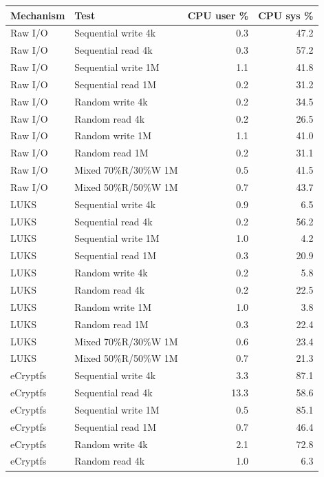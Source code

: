 \documentclass[a4paper]{article}
\begin{document}
\begin{table}[H]
    \centering
    \small
    \begin{tabular}{|l|l|r|r|}
        \hline
        Mechanism & Test & CPU user \% & CPU sys \% \\
        \hline
        Raw I/O & Sequential write 4k & 0.3 & 47.2 \\
        Raw I/O & Sequential read 4k & 0.3 & 57.2 \\
        Raw I/O & Sequential write 1M & 1.1 & 41.8 \\
        Raw I/O & Sequential read 1M & 0.2 & 31.2 \\
        Raw I/O & Random write 4k & 0.2 & 34.5 \\
        Raw I/O & Random read 4k & 0.2 & 26.5 \\
        Raw I/O & Random write 1M & 1.1 & 41.0 \\
        Raw I/O & Random read 1M & 0.2 & 31.1 \\
        Raw I/O & Mixed 70\%R/30\%W 1M & 0.5 & 41.5 \\
        Raw I/O & Mixed 50\%R/50\%W 1M & 0.7 & 43.7 \\
        LUKS & Sequential write 4k & 0.9 & 6.5 \\
        LUKS & Sequential read 4k & 0.2 & 56.2 \\
        LUKS & Sequential write 1M & 1.0 & 4.2 \\
        LUKS & Sequential read 1M & 0.3 & 20.9 \\
        LUKS & Random write 4k & 0.2 & 5.8 \\
        LUKS & Random read 4k & 0.2 & 22.5 \\
        LUKS & Random write 1M & 1.0 & 3.8 \\
        LUKS & Random read 1M & 0.3 & 22.4 \\
        LUKS & Mixed 70\%R/30\%W 1M & 0.6 & 23.4 \\
        LUKS & Mixed 50\%R/50\%W 1M & 0.7 & 21.3 \\
        eCryptfs & Sequential write 4k  & 3.3 & 87.1 \\
        eCryptfs & Sequential read 4k  & 13.3 & 58.6 \\
        eCryptfs & Sequential write 1M  & 0.5 & 85.1 \\
        eCryptfs & Sequential read 1M  & 0.7 & 46.4 \\
        eCryptfs & Random write 4k  & 2.1 & 72.8 \\
        eCryptfs & Random read 4k  & 1.0 & 6.3 \\

\end{tabular}
\end{table}
\end{document}
